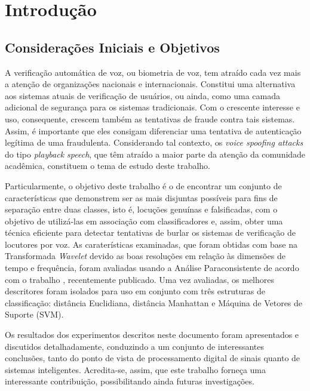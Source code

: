 \chapter{Introdução}
	\section{Considerações Iniciais e Objetivos}
		\par A verificação automática de voz, ou biometria de voz, tem atraído cada vez mais a atenção de organizações nacionais e internacionais. Constitui uma alternativa aos sistemas atuais de verificação de usuários, ou ainda, como uma camada adicional de segurança para os sistemas tradicionais. Com o crescente interesse e uso, consequente, crescem também as tentativas de fraude contra tais sistemas. Assim, é importante que eles consigam diferenciar uma tentativa de autenticação legítima de uma fraudulenta. Considerando tal contexto, os \textit{voice spoofing attacks} do tipo \textit{playback speech}, que têm atraído a maior parte da atenção da comunidade acadêmica, constituem o tema de estudo deste trabalho. 
		\\
		\par Particularmente, o objetivo deste trabalho é o de encontrar um conjunto de características que demonstrem ser as mais disjuntas possíveis para fins de separação entre duas classes, isto é, locuções genuínas e falsificadas, com o objetivo de utilizá-las em associação com classificadores e, assim, obter uma técnica eficiente para detectar tentativas de burlar os sistemas de verificação de locutores por voz. As caraterísticas examinadas, que foram obtidas com base na Transformada \textit{Wavelet} devido as boas resoluções em relação às dimensões de tempo e frequência, foram avaliadas usando a Análise Paraconsistente de acordo com o trabalho \cite{8588433}, recentemente publicado. Uma vez avaliadas, os melhores descritores foram isolados para uso em conjunto com três estruturas de classificação: distância Euclidiana, distância Manhattan e Máquina de Vetores de Suporte (SVM). 
		\\
		\par Os resultados dos experimentos descritos neste documento foram apresentados e discutidos detalhadamente, conduzindo a um conjunto de interessantes conclusões, tanto do ponto de vista de processamento digital de sinais quanto de sistemas inteligentes. Acredita-se, assim, que este trabalho forneça uma interessante contribuição, possibilitando ainda futuras investigações. 
	
